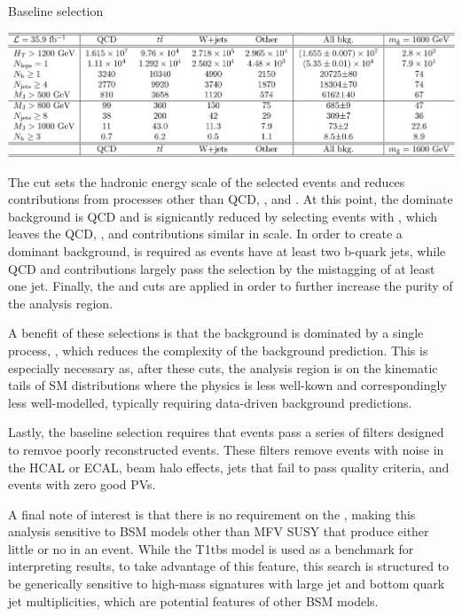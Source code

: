 \begin{section}{Baseline selection}
\begin{table}[tbp!]
\centering
\includegraphics[angle=0,width=0.90\columnwidth]{fig/cutflow.pdf}
\caption{Expected yields in $35~\ifb$ from simlulations of SM and signal processes.
Rows above the horizontal line correspond to requirements in the baseline selection, while those below correspond to additional kinematic cuts.}
\label{tab:cutflow}
\end{table}

The \baseHT cut sets the hadronic energy scale of the selected events and reduces contributions from processes other than QCD, \ttbar, and \Wjets.
At this point, the dominate background is QCD and is signicantly reduced by selecting events with \baseNleps, which leaves the QCD, \ttbar, and \Wjets contributions similar in scale.
In order to create a \ttbar dominant background, \baseNb is required as \ttbar events have at least two b-quark jets, while QCD and \Wjets contributions largely pass the selection by the mistagging of at least one jet.
Finally, the \baseNjets and \baseMJ cuts are applied in order to further increase the \ttbar purity of the analysis region.

A benefit of these selections is that the background is dominated by a single process, \ttbar, which reduces the complexity of the background prediction.
This is especially necessary as, after these cuts, the analysis region is on the kinematic tails of SM distributions where the physics is less well-kown and correspondingly less well-modelled, typically requiring data-driven background predictions.

Lastly, the baseline selection requires that events pass a series of filters designed to remvoe poorly reconstructed events. 
These filters remove events with noise in the HCAL or ECAL, beam halo effects, jets that fail to pass quality criteria, and events with zero good PVs.

A final note of interest is that there is no requirement on the \MET, making this analysis sensitive to BSM models other than MFV SUSY that produce either little or no \MET in an event.
While the T1tbs model is used as a benchmark for interpreting results, to take advantage of this feature, this search is structured to be generically sensitive to high-mass signatures with large jet and bottom quark jet multiplicities, which are potential features of other BSM models.

\end{section}


